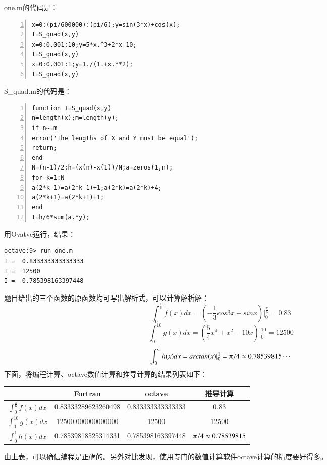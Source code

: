 \documentclass[hyperref,UTF-8]{ctexart}
\begin{document}
one.m的代码是：
\begin{Verbatim}[numbers=left,commandchars=\\\{\},fontsize=\small,frame=single]
x=0:(pi/600000):(pi/6);y=sin(3*x)+cos(x);
I=S_quad(x,y)
x=0:0.001:10;y=5*x.^3+2*x-10;
I=S_quad(x,y)
x=0:0.001:1;y=1./(1.+x.**2);
I=S_quad(x,y)
\end{Verbatim}

S\_quad.m的代码是：
\begin{Verbatim}[numbers=left,commandchars=\\\{\},fontsize=\small,frame=single]
function I=S_quad(x,y)
n=length(x);m=length(y);
if n~=m
error('The lengths of X and Y must be equal');
return;
end
N=(n-1)/2;h=(x(n)-x(1))/N;a=zeros(1,n);
for k=1:N
a(2*k-1)=a(2*k-1)+1;a(2*k)=a(2*k)+4;
a(2*k+1)=a(2*k+1)+1;
end
I=h/6*sum(a.*y);
\end{Verbatim}

用Ovatve运行，结果：
\begin{Verbatim}[fontsize=\small,frame=single]
octave:9> run one.m
I =  0.833333333333333
I =  12500
I =  0.785398163397448
\end{Verbatim}

题目给出的三个函数的原函数均可写出解析式，可以计算解析解：
$$\int_0^\frac{\pi}{6}f(x)dx=(-\frac{1}{3}cos3x+sinx)|_0^\frac{\pi}{6}=0.8\dot3$$
$$\int_0^{10}g(x)dx=(\frac{5}{4}x^4+x^2-10x)|_0^{10}=12500$$
$$\int_0^1h(x)\vadjust{\vspace{10pt}}dx=arctan(x)|_0^1=\piup/4\approx0.78539815\cdots$$
下面，将编程计算、octave数值计算和推导计算的结果\vadjust{\vspace{10pt}}列表如下：
\begin{center}
\renewcommand\arraystretch{2}
\begin{tabular}{c|c|c|c}\hline
&Fortran&octave&推导计算\\\hline
$\int_0^\frac{\pi}{6}f(x)dx$&0.83333289623260498&0.833333333333333&$0.8\dot3$\\\hline
$\int_0^{10}g(x)dx$&12500.000000000000&12500&12500\\\hline
$\int_0^1h(x)dx$&0.78539818525314331&0.785398163397448&$\piup/4\approx0.78539815$\\\hline
\end{tabular}
\end{center}
由上表，可以确信编程是正确的。另外对比发现，使用专门的数值计算软件octave计算的精度要好得多。
\end{document}
